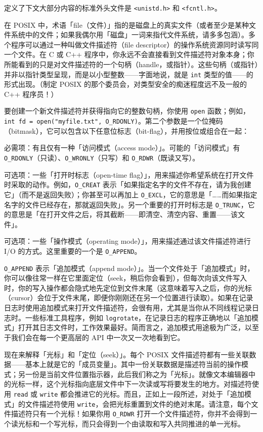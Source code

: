 定义了下文大部分内容的标准外头文件是 \texttt{<unistd.\allowbreak{}h>\allowbreak{}} 和 \texttt{<fcntl.\allowbreak{}h>\allowbreak{}}。

在 POSIX 中，术语「file（文件）」指的是磁盘上的真实文件（或者至少是某种文件系统中的文件；如果我偶尔用「磁盘」一词来指代文件系统，请多多包涵）。多个程序可以通过一种叫做文件描述符（file descriptor）的操作系统资源同时读写同一个文件。在 C 或 C++ 程序中，你永远不会直接看到文件描述符对象本身；你所能看到的只是对文件描述符的一个句柄（handle，或指针）。这些句柄（或指针）并非以指针类型呈现，而是以小型整数——字面地说，就是 \texttt{int} 类型的值——的形式出现。（制定 POSIX 的那个委员会，对类型安全的痴迷程度远不及一般的 C++ 程序员！）

要创建一个新文件描述符并获得指向它的整数句柄，你使用 \texttt{open} 函数；例如，\texttt{int fd = open(\allowbreak{}"myfile.\allowbreak{}txt",\allowbreak{} O\_\allowbreak{}RDONLY)\allowbreak{}}。第二个参数是一个位掩码（bitmask），它可以包含以下任意位标志（bit-flag），并用按位或组合在一起：

必需项：有且仅有一种「访问模式（access mode）」。可能的「访问模式」有 \texttt{O\_\allowbreak{}RDONLY}（只读）、\texttt{O\_\allowbreak{}WRONLY}（只写）和 \texttt{O\_\allowbreak{}RDWR}（既读又写）。

可选项：一些「打开时标志（open-time flag）」，用来描述你希望系统在打开文件时采取的动作。例如，\texttt{O\_\allowbreak{}CREAT} 表示「如果指定名字的文件不存在，请为我创建它」（而不是返回失败）；你甚至可以再加上 \texttt{O\_\allowbreak{}EXCL}，它的意思是「……而如果指定名字的文件已经存在，那就返回失败」。另一个重要的打开时标志是 \texttt{O\_\allowbreak{}TRUNC}，它的意思是「在打开文件之后，将其截断——即清空、清空内容、重置——该文件」。

可选项：一些「操作模式（operating mode）」，用来描述通过该文件描述符进行 I/O 的方式。这里重要的一个是 \texttt{O\_\allowbreak{}APPEND}。

\texttt{O\_\allowbreak{}APPEND} 表示「追加模式（append mode）」。当一个文件处于「追加模式」时，你可以像往常一样在它里面定位（seek，稍后你会看到），但每次向该文件写入时，你的写入操作都会隐式地先定位到文件末尾（这意味着写入之后，你的光标（cursor）会位于文件末尾，即便你刚刚还在另一个位置进行读取）。如果在记录日志时使用追加模式来打开文件描述符，会很有用，尤其是当你从不同线程记录日志时。一些标准工具程序，例如 \texttt{logrotate}，在记录日志的程序正确地以「追加模式」打开其日志文件时，工作效果最好。简而言之，追加模式用途极为广泛，以至于我们会在每一个更高层的 API 中一次又一次地看到它。

现在来解释「光标」和「定位（seek）」。每个 POSIX 文件描述符都有一些关联数据——基本上就是它的「成员变量」。其中一份关联数据是描述符当前的操作模式；另一份是当前文件位置指示器，此后我们称之为「光标」。就像文本编辑器中的光标一样，这个光标指向底层文件中下一次读或写将要发生的地方。对描述符使用 \texttt{read} 或 \texttt{write} 都会推进它的光标。而且，正如上一段所述，对处于「追加模式」的文件描述符使用 \texttt{write}，会把光标重置到文件的绝对末尾。请注意，每个文件描述符只有一个光标！如果你用 \texttt{O\_\allowbreak{}RDWR} 打开一个文件描述符，你并不会得到一个读光标和一个写光标，而只会得到一个由读取和写入共同推进的单一光标。


